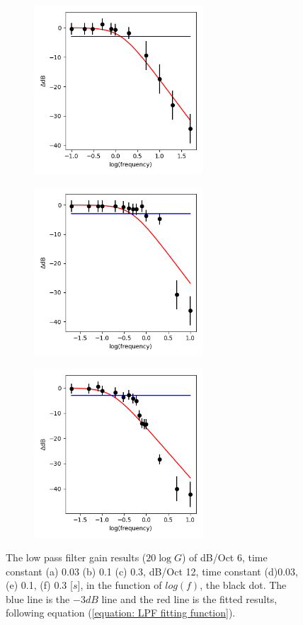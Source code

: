 \documentclass{article}
\begin{document}
\begin{figure}[H]
\begin{subfigure}[b]{6.3cm}
  \caption{}
\end{subfigure}
\hfill
\begin{subfigure}[b]{6.3cm}
  \centering
  \includegraphics[width=6.3cm]{../results/low_pass_filter_gain_freq_plot(db_oct12)(time_constant0.03).png}
  \caption{}
\end{subfigure}
\hfill
\begin{subfigure}[b]{6.3cm}
  \centering
  \includegraphics[width=6.3cm]{../results/low_pass_filter_gain_freq_plot(db_oct12)(time_constant0.1).png}
  \caption{}
\end{subfigure}
\hfill
\begin{subfigure}[b]{6.3cm}
  \centering
  \includegraphics[width=6.3cm]{../results/low_pass_filter_gain_freq_plot(db_oct12)(time_constant0.3).png}
  \caption{}
\end{subfigure}
\hfill
  \caption{The low pass filter gain results ($20 \log G$) of dB/Oct 6, time constant (a) 0.03 (b) 0.1 (c) 0.3, dB/Oct 12, time constant (d)0.03, (e) 0.1, (f) 0.3 [$s$], in the function of $log(f)$, the black dot.
    The blue line is the $-3dB$ line and the red line is the fitted results, following equation (\ref{equation: LPF fitting function}).}
  \label{fig: LPF plot}
\end{figure}
\end{document}
